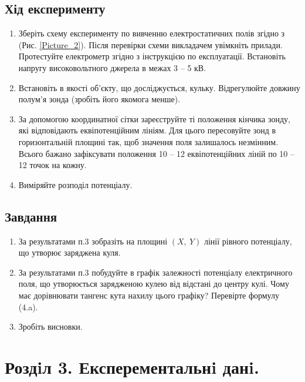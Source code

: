 \documentclass[a4paper,12pt]{article}
\begin{document}
\begin{justify}
		\subsection{Хід експерименту}
	\begin{enumerate}
		\item  Зберіть схему експерименту по вивченню електростатичних полів згідно з (Рис. \ref{Picture_2}). Після перевірки схеми викладачем увімкніть прилади. Протестуйте електрометр 
		згідно з інструкцією по експлуатації. Встановіть напругу високовольтного джерела в межах 3 – 5 кВ.
		\item Встановіть в якості об’єкту, що досліджується, кульку. Відрегулюйте довжину полум’я зонда (зробіть його якомога менше).
		\item За допомогою координатної сітки зареєструйте ті положення кінчика зонду, які відповідають еквіпотенційним лініям. Для цього пересовуйте зонд в горизонтальній площині так, щоб значення поля залишалось незмінним. Всього бажано зафіксувати положення 10 – 12 еквіпотенційних ліній по 10 – 12 точок на кожну.
		\item Виміряйте розподіл потенціалу.
	\end{enumerate}
		\subsection{Завдання}
	\begin{enumerate}
		\item  За результатами п.3 зобразіть на площині $(X,\:Y)$ лінії рівного потенціалу, що утворює заряджена куля.
		\item За результатами п.3 побудуйте в графік залежності потенціалу електричного поля, що утворюється зарядженою кулею від відстані до центру кулі. Чому має дорівнювати тангенс кута нахилу цього графіку? Перевірте формулу (4.a).
		\item Зробіть висновки.
	\end{enumerate}\newpage
	\section{Роздiл 3. Експерементальнi данi.}

\end{justify}
\end{document}
